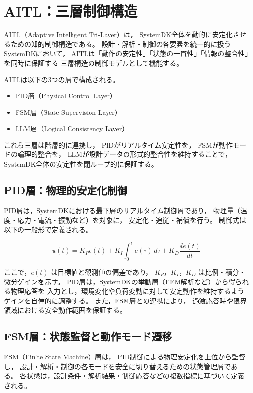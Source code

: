 \section{AITL：三層制御構造}

AITL（Adaptive Intelligent Tri-Layer）は，
SystemDK全体を動的に安定化させるための知的制御構造である。
設計・解析・制御の各要素を統一的に扱うSystemDKにおいて，
AITLは「動作の安定性」「状態の一貫性」「情報の整合性」を同時に保証する
三層構造の制御モデルとして機能する。

AITLは以下の3つの層で構成される。

\begin{itemize}
  \item PID層（Physical Control Layer）
  \item FSM層（State Supervision Layer）
  \item LLM層（Logical Consistency Layer）
\end{itemize}

これら三層は階層的に連携し，
PIDがリアルタイム安定性を，
FSMが動作モードの論理的整合を，
LLMが設計データの形式的整合性を維持することで，
SystemDK全体の安定性を閉ループ的に保証する。

\subsection{PID層：物理的安定化制御}
PID層は，SystemDKにおける最下層のリアルタイム制御層であり，
物理量（温度・応力・電流・振動など）を対象に，
安定化・追従・補償を行う。
制御式は以下の一般形で定義される。

\begin{equation}
u(t) = K_P e(t) + K_I \int_{0}^{t} e(\tau)\,d\tau + K_D \frac{de(t)}{dt}
\end{equation}

ここで，$e(t)$ は目標値と観測値の偏差であり，
$K_P$，$K_I$，$K_D$ は比例・積分・微分ゲインを示す。
PID層は，SystemDKの挙動層（FEM解析など）から得られる物理応答を
入力とし，環境変化や負荷変動に対して安定動作を維持するようゲインを自律的に調整する。
また，FSM層との連携により，
過渡応答時や限界領域における安全動作範囲を保証する。

\subsection{FSM層：状態監督と動作モード遷移}
FSM（Finite State Machine）層は，
PID制御による物理安定化を上位から監督し，
設計・解析・制御の各モードを安全に切り替えるための状態管理層である。
各状態は，設計条件・解析結果・制御応答などの複数指標に基づいて定義される。


